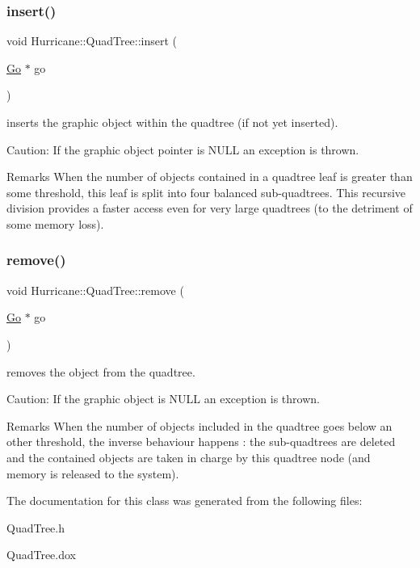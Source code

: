 \subsubsection{\texorpdfstring{insert()}{insert()}}
{\footnotesize\ttfamily void Hurricane\+::\+Quad\+Tree\+::insert (\begin{DoxyParamCaption}\item[{\mbox{\hyperlink{classHurricane_1_1Go}{Go}} $\ast$}]{go }\end{DoxyParamCaption})}

inserts the graphic object within the quadtree (if not yet inserted).

\begin{DoxyParagraph}{Caution\+: If the graphic object pointer is N\+U\+LL an exception is thrown. }

\end{DoxyParagraph}
\begin{DoxyRemark}{Remarks}
When the number of objects contained in a quadtree leaf is greater than some threshold, this leaf is split into four balanced sub-\/quadtrees. This recursive division provides a faster access even for very large quadtrees (to the detriment of some memory loss). 
\end{DoxyRemark}
\mbox{\label{classHurricane_1_1QuadTree_af646d2864c70f6456d845c2d6a8d1785}} 
\subsubsection{\texorpdfstring{remove()}{remove()}}
{\footnotesize\ttfamily void Hurricane\+::\+Quad\+Tree\+::remove (\begin{DoxyParamCaption}\item[{\mbox{\hyperlink{classHurricane_1_1Go}{Go}} $\ast$}]{go }\end{DoxyParamCaption})}

removes the object from the quadtree.

\begin{DoxyParagraph}{Caution\+: If the graphic object is N\+U\+LL an exception is thrown. }

\end{DoxyParagraph}
\begin{DoxyRemark}{Remarks}
When the number of objects included in the quadtree goes below an other threshold, the inverse behaviour happens \+: the sub-\/quadtrees are deleted and the contained objects are taken in charge by this quadtree node (and memory is released to the system). 
\end{DoxyRemark}


The documentation for this class was generated from the following files\+:\begin{DoxyCompactItemize}
\item 
Quad\+Tree.\+h\item 
Quad\+Tree.\+dox\end{DoxyCompactItemize}
